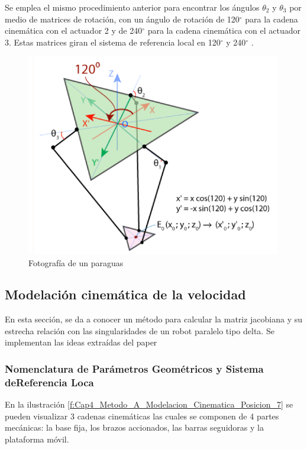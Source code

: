 Se emplea el mismo procedimiento anterior para encontrar los ángulos  \(  \theta _{2} \)  y  \(  \theta _{3} \)  por medio de matrices de rotación, con un ángulo de rotación de 120$ ^{\circ} $  para la cadena cinemática con el actuador 2 y de 240$ ^{\circ} $  para la cadena cinemática con el actuador 3. Estas matrices giran el sistema de referencia local en 120$ ^{\circ} $  y 240$ ^{\circ} $ . 

        \begin{figure}[htb]
             \centering
             \includegraphics[width=0.8\linewidth]{Main/Chapter4/Images4/Metodo_A_Modelacion_Cinematica_Posicion_6.png}
              \caption{Fotografía de un paraguas}
              \label{f:Cap4_Metodo_A_Modelacion_Cinematica_Posicion_6}
        \end{figure}

        \newpage

    \subsection{Modelación cinemática de la velocidad}\label{ma_cvel}
        En esta sección, se da a conocer un método para calcular la matriz jacobiana y su estrecha relación con las singularidades de un robot paralelo tipo delta. Se implementan las ideas extraídas del paper \cite{Hsu_modelling_ai}
    
        \subsubsection{Nomenclatura de Parámetros Geométricos y Sistema deReferencia Loca}
        
        En la ilustración \ref{f:Cap4_Metodo_A_Modelacion_Cinematica_Posicion_7} se pueden visualizar 3 cadenas cinemáticas las cuales se componen de 4 partes mecánicas: la base fija, los brazos accionados, las barras seguidoras y la plataforma móvil.
        
